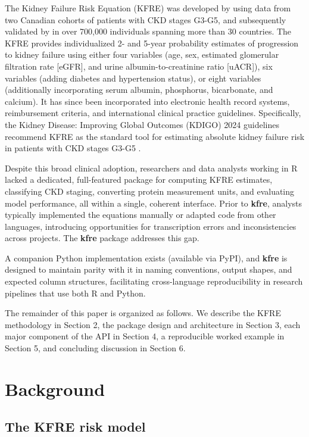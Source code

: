 The Kidney Failure Risk Equation (KFRE) was developed by \citet{tangri2011} using data
from two Canadian cohorts of patients with CKD stages G3-G5, and subsequently
validated by \citet{tangri2016} in over 700,000 individuals spanning more than 30
countries. The KFRE provides individualized 2- and 5-year probability estimates
of progression to kidney failure using either four variables (age, sex, estimated
glomerular filtration rate {[}eGFR{]}, and urine albumin-to-creatinine ratio
{[}uACR{]}), six variables (adding diabetes and hypertension status), or eight
variables (additionally incorporating serum albumin, phosphorus, bicarbonate,
and calcium). It has since been incorporated into electronic health record
systems, reimbursement criteria, and international clinical practice guidelines.
Specifically, the Kidney Disease: Improving Global Outcomes (KDIGO) 2024
guidelines recommend KFRE as the standard tool for estimating absolute kidney
failure risk in patients with CKD stages G3-G5 \citep{kdigo2024}.

Despite this broad clinical adoption, researchers and data analysts working in R
lacked a dedicated, full-featured package for computing KFRE estimates,
classifying CKD staging, converting protein measurement units, and evaluating
model performance, all within a single, coherent interface. Prior to \textbf{kfre},
analysts typically implemented the equations manually or adapted code from other
languages, introducing opportunities for transcription errors and inconsistencies
across projects. The \textbf{kfre} package \citep{shpaner2025kfre} addresses this gap.

A companion Python implementation exists (available via PyPI), and \textbf{kfre} is
designed to maintain parity with it in naming conventions, output shapes, and
expected column structures, facilitating cross-language reproducibility in
research pipelines that use both R and Python.

The remainder of this paper is organized as follows. We describe the KFRE
methodology in Section 2, the package design and architecture in Section
3, each major component of the API in Section 4, a reproducible worked example
in Section 5, and concluding discussion in Section 6.

\section{Background}\label{background}

\subsection{The KFRE risk model}\label{the-kfre-risk-model}

